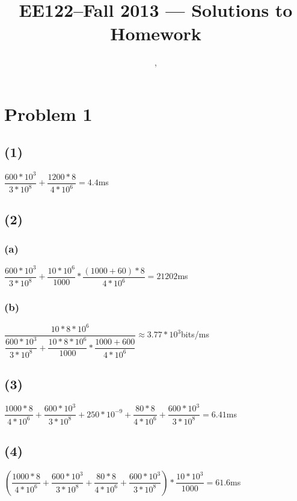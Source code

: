 \documentclass[11pt]{article}
\title{EE122--Fall 2013 --- Solutions to Homework \Homework}
\author{\Name, \texttt{\Login}}
\begin{document}
\maketitle

\section*{Problem 1}
\label{pg:end-of-p1}



\subsection*{(1)}
$\dfrac{600*10^3}{3*10^8}+\dfrac{1200*8}{4*10^6}=4.4$ms
\subsection*{(2)}
\subsubsection*{(a)}
$\dfrac{600*10^3}{3*10^8}+\dfrac{10*10^6}{1000}*\dfrac{(1000+60)*8}{4*10^6}=21202$ms
\subsubsection*{(b)}
$\dfrac{10*8*10^6}{\dfrac{600*10^3}{3*10^8}+\dfrac{10*8*10^6}{1000}*\dfrac{1000+600}{4*10^6}}\approx{3.77*10^3}$bits/ms
\subsection*{(3)}
$\dfrac{1000*8}{4*10^6}+\dfrac{600*10^3}{3*10^8}+250*10^{-9}+\dfrac{80*8}{4*10^6}+\dfrac{600*10^3}{3*10^8}=6.41$ms
\subsection*{(4)}
$(\dfrac{1000*8}{4*10^6}+\dfrac{600*10^3}{3*10^8}+\dfrac{80*8}{4*10^6}+\dfrac{600*10^3}{3*10^8})*\dfrac{10*10^3}{1000}=61.6$ms


%
\newpage
\end{document}
